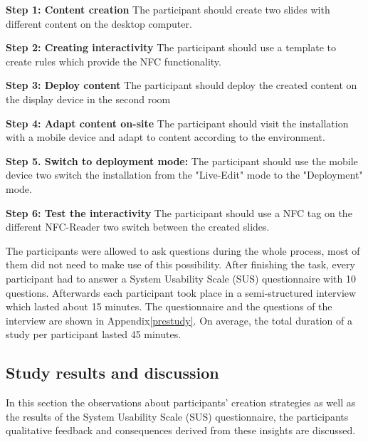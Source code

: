 \textbf{Step 1: Content creation}
\newline
The participant should create two slides with different content on the desktop computer.

\textbf{Step 2: Creating interactivity} 
\newline
The participant should use a template to create rules which provide the NFC functionality.

\textbf{Step 3: Deploy content} 
\newline
The participant should deploy the created content on the display device in the second room 

\textbf{Step 4: Adapt content on-site} 
\newline
The participant should visit the installation with a mobile device and adapt to content according to the environment.

\textbf{Step 5. Switch to deployment mode:} 
\newline
The participant should use the mobile device two switch the installation from the "Live-Edit" mode to the "Deployment" mode.

\textbf{Step 6: Test the interactivity} 
\newline
The participant should use a NFC tag on the different NFC-Reader two switch between the created slides.

The participants were allowed to ask questions during the whole process, most of them did not need to make use of this possibility. After finishing the task, every participant had to answer a System Usability Scale (SUS) questionnaire with 10 questions. Afterwards each participant took place in a semi-structured interview which lasted about 15 minutes. The questionnaire and the questions of the interview are shown in Appendix\ref{prestudy}. On average, the total duration of a study per participant lasted 45 minutes.

\subsection{Study results and discussion}
In this section the observations about participants' creation strategies as well as the results of the System Usability Scale (SUS) questionnaire, the participants qualitative feedback and consequences derived from these insights are discussed.
